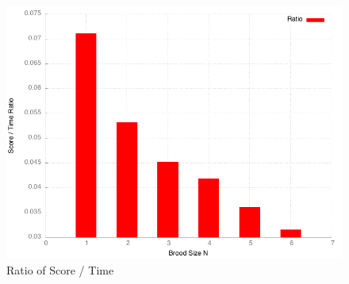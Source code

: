 \documentclass{acm_proc_article-sp}
\begin{document}
\begin{figure}
\centering
\includegraphics[width=.9\linewidth]{./results-ratios.png}
\caption{\label{fig:Figure-2}Ratio of Score / Time}
\end{figure}

%

%
%
\balancecolumns
\end{document}
